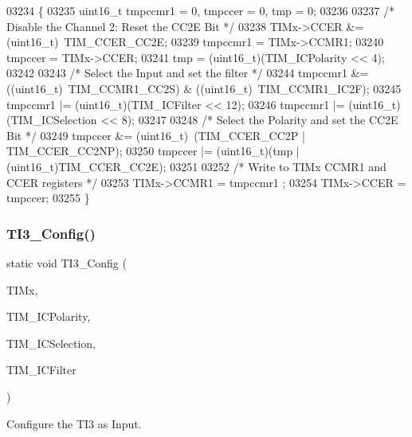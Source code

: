 \begin{DoxyCode}
03234 \{
03235   uint16\_t tmpccmr1 = 0, tmpccer = 0, tmp = 0;
03236 
03237   \textcolor{comment}{/* Disable the Channel 2: Reset the CC2E Bit */}
03238   TIMx->CCER &= (uint16\_t)~TIM_CCER_CC2E;
03239   tmpccmr1 = TIMx->CCMR1;
03240   tmpccer = TIMx->CCER;
03241   tmp = (uint16\_t)(TIM\_ICPolarity << 4);
03242 
03243   \textcolor{comment}{/* Select the Input and set the filter */}
03244   tmpccmr1 &= ((uint16\_t)~TIM_CCMR1_CC2S) & ((uint16\_t)~TIM_CCMR1_IC2F);
03245   tmpccmr1 |= (uint16\_t)(TIM\_ICFilter << 12);
03246   tmpccmr1 |= (uint16\_t)(TIM\_ICSelection << 8);
03247 
03248   \textcolor{comment}{/* Select the Polarity and set the CC2E Bit */}
03249   tmpccer &= (uint16\_t)~(TIM_CCER_CC2P | TIM_CCER_CC2NP);
03250   tmpccer |=  (uint16\_t)(tmp | (uint16\_t)TIM_CCER_CC2E);
03251 
03252   \textcolor{comment}{/* Write to TIMx CCMR1 and CCER registers */}
03253   TIMx->CCMR1 = tmpccmr1 ;
03254   TIMx->CCER = tmpccer;
03255 \}
\end{DoxyCode}
\mbox{\label{group__TIM__Private__Functions_gae0776241db23f0f31950476804dad588}} 
\subsubsection{T\+I3\+\_\+\+Config()}
{\footnotesize\ttfamily static void T\+I3\+\_\+\+Config (\begin{DoxyParamCaption}\item[{\textbf{ T\+I\+M\+\_\+\+Type\+Def} $\ast$}]{T\+I\+Mx,  }\item[{uint16\+\_\+t}]{T\+I\+M\+\_\+\+I\+C\+Polarity,  }\item[{uint16\+\_\+t}]{T\+I\+M\+\_\+\+I\+C\+Selection,  }\item[{uint16\+\_\+t}]{T\+I\+M\+\_\+\+I\+C\+Filter }\end{DoxyParamCaption})\hspace{0.3cm}{\ttfamily [static]}}



Configure the T\+I3 as Input. 


